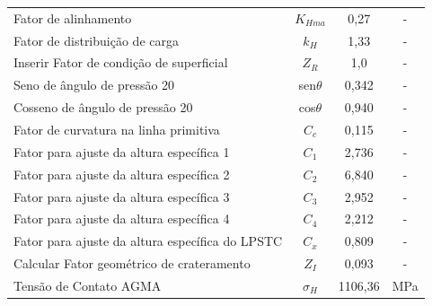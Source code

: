 \documentclass[12pt,a4paper]{article}
\begin{document}
\begin{table}[!htb]
\begin{tabular}{l c c c}
Fator de alinhamento                                                                                                         & $K_{Hma}$           & 0,27           & -             \\
Fator de distribuição de carga                                                                                               & $k_H$             & 1,33           & -             \\
Inserir Fator de condição de superficial                                                                                     & $Z_R$             & 1,0              & -             \\
Seno de ângulo de pressão 20                                                                                                 & sen$\theta$           & 0,342          & -             \\
Cosseno de ângulo de pressão 20                                                                                              & cos$\theta$           & 0,940          & -             \\
Fator de curvatura na linha primitiva                                                                                        & $C_c$             & 0,115          & -             \\
Fator para ajuste da altura específica 1                                                                                     & $C_1$             & 2,736          & -             \\
Fator para ajuste da altura específica 2                                                                                     & $C_2$             & 6,840          & -             \\
Fator para ajuste da altura específica 3                                                                                     & $C_3$             & 2,952          & -             \\
Fator para ajuste da altura específica 4                                                                                     & $C_4$             & 2,212          & -             \\
Fator para ajuste da altura específica do LPSTC                                                                              & $C_x$             & 0,809          & -             \\
Calcular Fator geométrico de crateramento                                                                                    & $Z_I$             & 0,093          & -             \\
Tensão de Contato AGMA                                                                                                       & $\sigma_H$              & 1106,36        & MPa             \\ \hline  
\end{tabular}
\end{table}
\end{document}
